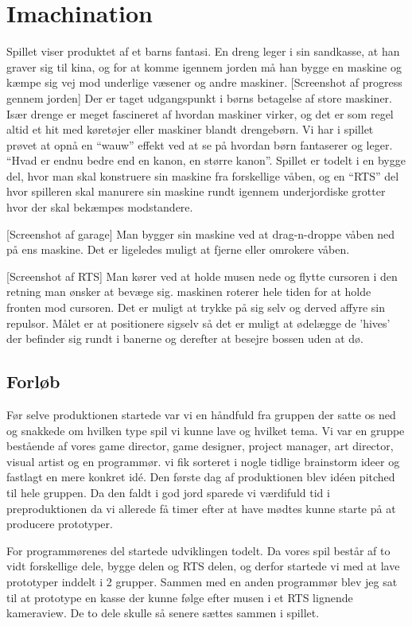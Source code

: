 \section{Imachination}
Spillet viser produktet af et barns fantasi. En dreng leger i sin sandkasse, at han graver sig til kina, og for at komme igennem jorden må han bygge en maskine og kæmpe sig vej mod underlige væsener og andre maskiner.
[Screenshot af progress gennem jorden]
Der er taget udgangspunkt i børns betagelse af store maskiner. Især drenge er meget fascineret af hvordan maskiner virker, og det er som regel altid et hit med køretøjer eller maskiner blandt drengebørn. Vi har i spillet prøvet at opnå en ``wauw'' effekt ved at se på hvordan børn fantaserer og leger. ``Hvad er endnu bedre end en kanon, en større kanon''.
Spillet er todelt i en bygge del, hvor man skal konstruere sin maskine fra forskellige våben, og en ``RTS'' del hvor spilleren skal manurere sin maskine rundt igennem underjordiske grotter hvor der skal bekæmpes modstandere.

[Screenshot af garage]
Man bygger sin maskine ved at drag-n-droppe våben ned på ens maskine. Det er ligeledes muligt at fjerne eller omrokere våben.

[Screenshot af RTS]
Man kører ved at holde musen nede og flytte cursoren i den retning man ønsker at bevæge sig. maskinen roterer hele tiden for at holde fronten mod cursoren. Det er muligt at trykke på sig selv og derved affyre sin repulsor. Målet er at positionere sigselv så det er muligt at ødelægge de 'hives' der befinder sig rundt i banerne og derefter at besejre bossen uden at dø.


\subsection{Forløb}

Før selve produktionen startede var vi en håndfuld fra gruppen der satte os ned og snakkede om hvilken type spil vi kunne lave og hvilket tema. Vi var en gruppe bestående af vores game director, game designer, project manager, art director, visual artist og en programmør. vi fik sorteret i nogle tidlige brainstorm ideer og fastlagt en mere konkret idé. Den første dag af produktionen blev idéen pitched til hele gruppen. Da den faldt i god jord sparede vi værdifuld tid i preproduktionen da vi allerede få timer efter at have mødtes kunne starte på at producere prototyper.

For programmørenes del startede udviklingen todelt. Da vores spil består af to vidt forskellige dele, bygge delen og RTS delen, og derfor startede vi med at lave prototyper inddelt i 2 grupper. Sammen med en anden programmør blev jeg sat til at prototype en kasse der kunne følge efter musen i et RTS lignende kameraview. De to dele skulle så senere sættes sammen i spillet.

